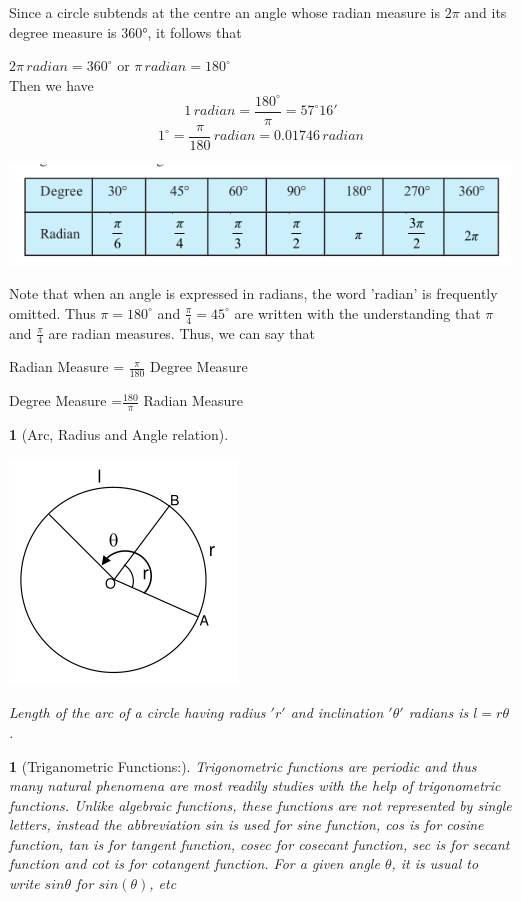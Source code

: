 \documentclass[12pt]{article}
\theoremstyle{colored}
\newtheorem*{defn}{}
\theoremstyle{subcolored}
\newtheorem*{subdefn}{}
\begin{document}
\begin{multicols}{2}
    Since a circle subtends at the centre
an angle whose radian measure is $2\pi$ and its degree measure is $360°$, it follows that

$2\pi\,radian =360^\circ$ or $\pi \, radian =180^\circ$
\\Then we have
$$1 \, radian =\frac{180^\circ}{\pi}=57^\circ 16'$$
$$1^\circ =\frac{\pi}{180} \,radian=0.01746 \, radian$$

\begin{center}
  \includegraphics[scale=0.45]{im5.png}
\end{center}
Note that when an angle is expressed in radians, the word 'radian' is frequently omitted.
Thus $\pi= 180^\circ$ and $\frac{\pi}{4}=45^\circ$ are written with the understanding that $\pi$ and $\frac{\pi}{4}$
are radian measures. Thus, we can say that

\begin{center}
  Radian Measure = $\frac{\pi}{180}$ Degree Measure
\end{center}
\begin{center}
  Degree Measure =$\frac{180}{\pi}$ Radian Measure
\end{center}

\begin{subdefn}[Arc, Radius and Angle relation]
  \begin{center}
    \includegraphics[scale=0.45]{im6.png}
  \end{center}
  Length of the arc of a circle having radius $'r'$
and inclination $'\theta'$ radians is $l=r\theta$.
\end{subdefn}


\begin{defn}[Triganometric Functions:]
  Trigonometric
functions are periodic and thus many natural
phenomena are most readily studies with the
help of trigonometric functions. Unlike
algebraic functions, these functions are not
represented by single letters, instead the
abbreviation sin is used for sine function, cos is
for cosine function, tan is for tangent function,
cosec for cosecant function, sec is for secant
function and cot is for cotangent function. For a
given angle $\theta$, it is usual to write $sin\theta$ for $sin(\theta)$,
etc
  

\end{defn}
\end{multicols}
\end{document}
